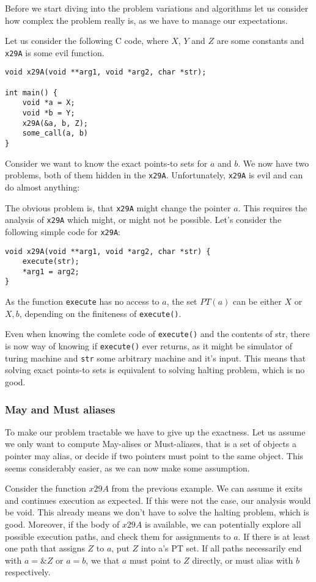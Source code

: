 Before we start diving into the problem variations and algorithms let us
consider how complex the problem really is, as we have to manage our
expectations.

Let us consider the following C code, where $X$, $Y$ and $Z$ are some constants and
{\tt x29A} is some evil function.

\begin{verbatim}
void x29A(void **arg1, void *arg2, char *str);

int main() {
	void *a = X;
	void *b = Y;
	x29A(&a, b, Z);
	some_call(a, b)
}
\end{verbatim}

Consider we want to know the exact points-to sets for $a$ and $b$. We now have
two problems, both of them hidden in the {\tt x29A}. Unfortunately, {\tt x29A}
is evil and can do almost anything:

The obvious problem is, that {\tt x29A} might change the pointer $a$. This
requires the analysis of {\tt x29A} which might, or might not be possible. Let's
consider the following simple code for {\tt x29A}:

\begin{verbatim}
void x29A(void **arg1, void *arg2, char *str) {
	execute(str);
	*arg1 = arg2;
}
\end{verbatim}

As the function {\tt execute} has no access to $a$, the set $PT(a)$ can be
either ${X}$ or ${X, b}$, depending on the finiteness of {\tt execute()}.

Even when knowing the comlete code of {\tt execute()} and the contents of {str},
there is now way of knowing if {\tt execute()} ever returns, as it might be
simulator of turing machine and {\tt str} some arbitrary machine and it's input.
This means that solving exact points-to sets is equivalent  to solving halting
problem, which is no good.

\subsubsection{May and Must aliases}

To make our problem tractable we have to give up the exactness. Let us assume we
only want to compute May-alises or Must-aliases, that is a set of objects a
pointer may alias, or decide if two pointers must point to the same object. This
seems considerably easier, as we can now make some assumption. 

Consider the function $x29A$ from the previous example. We can assume it exits
and continues execution as expected. If this were not the case, our analysis
would be void.  This already means we don't have to solve the halting problem,
which is good.  Moreover, if the body of $x29A$ is available, we can potentially
explore all possible execution paths, and check them for assignments to $a$. If
there is at least one path that assigns $Z$ to $a$, put $Z$ into a's PT set. If
all paths necessarily end with $a = \&Z$ or $a = b$, we that $a$ must point to
$Z$ directly, or must alias with $b$ respectively.

